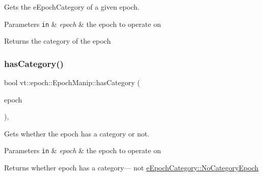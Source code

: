Gets the {\ttfamily e\+Epoch\+Category} of a given epoch. 


\begin{DoxyParams}[1]{Parameters}
\mbox{\tt in}  & {\em epoch} & the epoch to operate on\\
\hline
\end{DoxyParams}
\begin{DoxyReturn}{Returns}
the category of the {\ttfamily epoch} 
\end{DoxyReturn}
\mbox{\label{structvt_1_1epoch_1_1_epoch_manip_a57a6313d8f4ffc685ee47b2a881079ac}} 
\subsubsection{\texorpdfstring{has\+Category()}{hasCategory()}}
{\footnotesize\ttfamily bool vt\+::epoch\+::\+Epoch\+Manip\+::has\+Category (\begin{DoxyParamCaption}\item[{\hyperlink{namespacevt_a985a5adf291c34a3ca263b3378388236}{Epoch\+Type} const \&}]{epoch }\end{DoxyParamCaption})\hspace{0.3cm}{\ttfamily [inline]}, {\ttfamily [static]}}



Gets whether the epoch has a category or not. 


\begin{DoxyParams}[1]{Parameters}
\mbox{\tt in}  & {\em epoch} & the epoch to operate on\\
\hline
\end{DoxyParams}
\begin{DoxyReturn}{Returns}
whether {\ttfamily epoch} has a category--- not {\ttfamily \hyperlink{namespacevt_1_1epoch_a956abe0aceef0d10a988de8acb002c7caa6136714a068313660a40ae6bd15410c}{e\+Epoch\+Category\+::\+No\+Category\+Epoch}} 
\end{DoxyReturn}
\mbox{\label{structvt_1_1epoch_1_1_epoch_manip_a00210a34334fb86984cfbd08bae74929}} 
